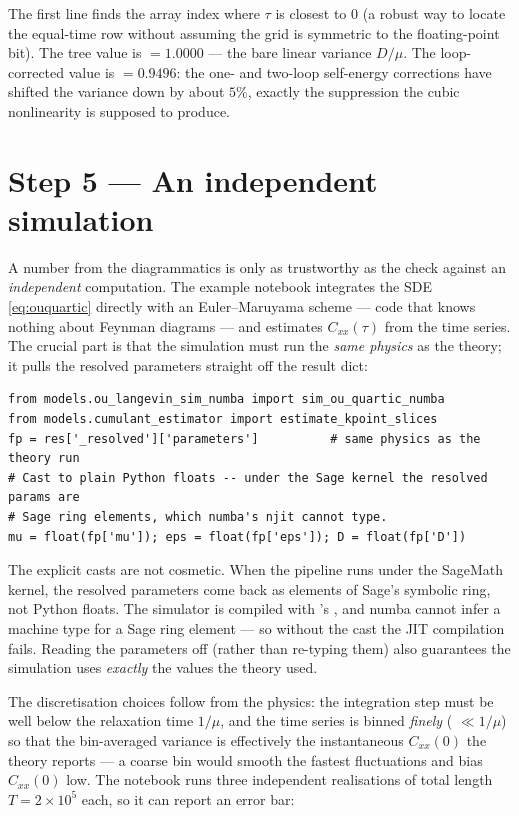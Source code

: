 The first line finds the array index where $\tau$ is closest to $0$ (a robust way
to locate the equal-time row without assuming the grid is symmetric to the
floating-point bit). The tree value is  $= 1.0000$ --- the bare
linear variance $D/\mu$. The loop-corrected value is  $= 0.9496$:
the one- and two-loop self-energy corrections have shifted the variance down by
about $5\%$, exactly the suppression the cubic nonlinearity is supposed to
produce.

\section{Step 5 --- An independent simulation}

A number from the diagrammatics is only as trustworthy as the check against an
\emph{independent} computation. The example notebook integrates the SDE
\eqref{eq:ouquartic} directly with an Euler--Maruyama scheme --- code that knows
nothing about Feynman diagrams --- and estimates $C_{xx}(\tau)$ from the
time series. The crucial part is that the simulation must run the \emph{same
physics} as the theory; it pulls the resolved parameters straight off the result
dict:

\begin{lstlisting}
from models.ou_langevin_sim_numba import sim_ou_quartic_numba
from models.cumulant_estimator import estimate_kpoint_slices
fp = res['_resolved']['parameters']          # same physics as the theory run
# Cast to plain Python floats -- under the Sage kernel the resolved params are
# Sage ring elements, which numba's njit cannot type.
mu = float(fp['mu']); eps = float(fp['eps']); D = float(fp['D'])
\end{lstlisting}

\begin{gotcha}
The explicit  casts are not cosmetic. When the pipeline runs
under the SageMath kernel, the resolved parameters come back as elements of
Sage's symbolic ring, not Python floats. The simulator is compiled with
's , and numba cannot infer a machine type for a Sage ring
element --- so without the cast the JIT compilation fails. Reading the parameters
off  (rather than re-typing them) also
guarantees the simulation uses \emph{exactly} the values the theory used.
\end{gotcha}

The discretisation choices follow from the physics: the integration step
 must be well below the relaxation time $1/\mu$, and the time
series is binned \emph{finely} ( $\ll 1/\mu$) so that the
bin-averaged variance is effectively the instantaneous $C_{xx}(0)$ the theory
reports --- a coarse bin would smooth the fastest fluctuations and bias
$C_{xx}(0)$ low. The notebook runs three independent realisations of total
length $T = 2\times 10^{5}$ each, so it can report an error bar:

